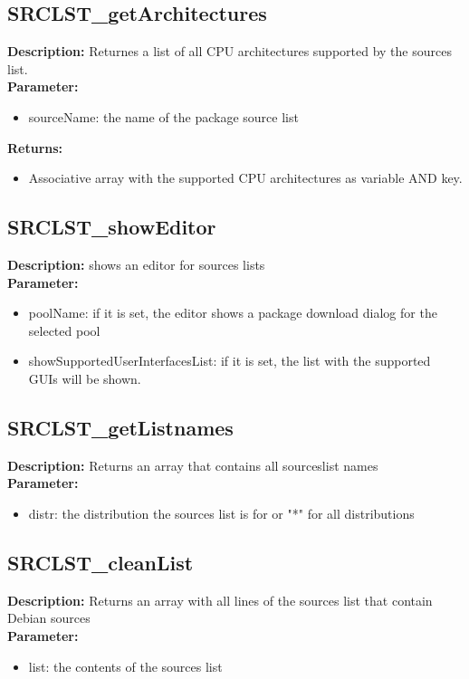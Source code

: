 \subsection{SRCLST\_getArchitectures}
\textbf{Description:} Returnes a list of all CPU architectures supported by the sources list.\\
\textbf{Parameter:}
\begin{itemize}
\item sourceName: the name of the package source list
\end{itemize}
\textbf{Returns:}
\begin{itemize}
\item Associative array with the supported CPU architectures as variable AND key.
\end{itemize}

\subsection{SRCLST\_showEditor}
\textbf{Description:} shows an editor for sources lists\\
\textbf{Parameter:}
\begin{itemize}
\item poolName: if it is set, the editor shows a package download dialog for the selected pool
\item showSupportedUserInterfacesList: if it is set, the list with the supported GUIs will be shown.
\end{itemize}

\subsection{SRCLST\_getListnames}
\textbf{Description:} Returns an array that contains all sourceslist names\\
\textbf{Parameter:}
\begin{itemize}
\item distr: the distribution the sources list is for or "*" for all distributions
\end{itemize}

\subsection{SRCLST\_cleanList}
\textbf{Description:} Returns an array with all lines of the sources list that contain Debian sources\\
\textbf{Parameter:}
\begin{itemize}
\item list: the contents of the sources list
\end{itemize}

